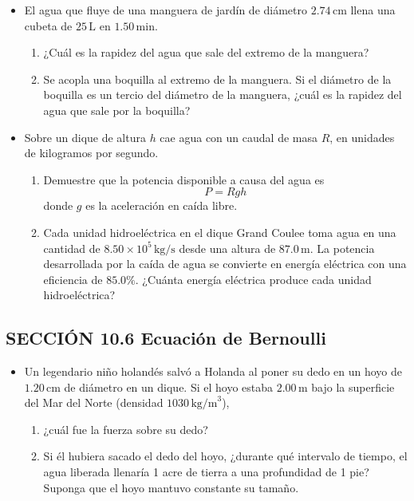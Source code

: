 \documentclass[11pt,a4paper]{article}
\begin{document}
\begin{itemize}
    \item[\textbf{20.}] El agua que fluye de una manguera de jardín de diámetro \(2.74\,\text{cm}\) llena una cubeta de \(25\,\text{L}\) en \(1.50\,\text{min}\).
    \begin{enumerate}
        \item ¿Cuál es la rapidez del agua que sale del extremo de la manguera?
        \item Se acopla una boquilla al extremo de la manguera. Si el diámetro de la boquilla es un tercio del diámetro de la manguera, ¿cuál es la rapidez del agua que sale por la boquilla?
    \end{enumerate}
    \vspace*{7cm}
    
    \item[\textbf{21.}] Sobre un dique de altura \(h\) cae agua con un caudal de masa \(R\), en unidades de kilogramos por segundo.
    \begin{enumerate}
        \item Demuestre que la potencia disponible a causa del agua es 
        \[
        P = Rgh
        \]
        donde \(g\) es la aceleración en caída libre.
        \item Cada unidad hidroeléctrica en el dique Grand Coulee toma agua en una cantidad de \(8.50 \times 10^5\,\text{kg/s}\) desde una altura de \(87.0\,\text{m}\). La potencia desarrollada por la caída de agua se convierte en energía eléctrica con una eficiencia de \(85.0\%\). ¿Cuánta energía eléctrica produce cada unidad hidroeléctrica?
    \end{enumerate}
    \vspace*{7cm}
\end{itemize}

\subsection*{SECCIÓN 10.6 Ecuación de Bernoulli}

\begin{itemize}
    \item[\textbf{22.}] Un legendario niño holandés salvó a Holanda al poner su dedo en un hoyo de \(1.20\,\text{cm}\) de diámetro en un dique. Si el hoyo estaba \(2.00\,\text{m}\) bajo la superficie del Mar del Norte (densidad \(1030\,\text{kg/m}^3\)),
    \begin{enumerate}
        \item ¿cuál fue la fuerza sobre su dedo?
        \item Si él hubiera sacado el dedo del hoyo, ¿durante qué intervalo de tiempo, el agua liberada llenaría 1 acre de tierra a una profundidad de 1 pie? Suponga que el hoyo mantuvo constante su tamaño.
    \end{enumerate}
    \vspace*{7cm}
\end{itemize}
\end{document}
